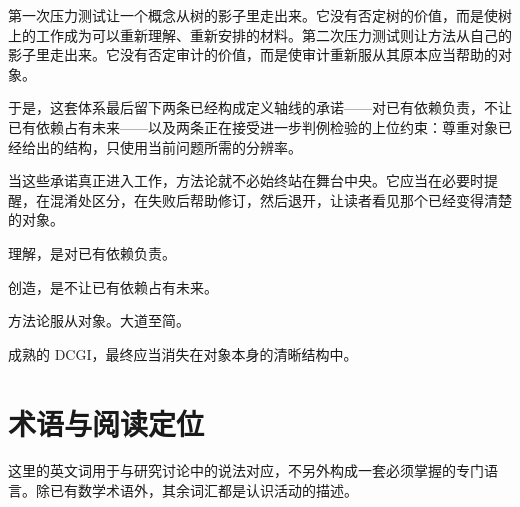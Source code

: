 \documentclass[UTF8,zihao=-4,fontset=none,oneside,openany]{ctexbook}
\begin{document}
第一次压力测试让一个概念从树的影子里走出来。它没有否定树的价值，而是使树上的工作成为可以重新理解、重新安排的材料。第二次压力测试则让方法从自己的影子里走出来。它没有否定审计的价值，而是使审计重新服从其原本应当帮助的对象。

于是，这套体系最后留下两条已经构成定义轴线的承诺——对已有依赖负责，不让已有依赖占有未来——以及两条正在接受进一步判例检验的上位约束：尊重对象已经给出的结构，只使用当前问题所需的分辨率。

当这些承诺真正进入工作，方法论就不必始终站在舞台中央。它应当在必要时提醒，在混淆处区分，在失败后帮助修订，然后退开，让读者看见那个已经变得清楚的对象。

\begin{casequote}
理解，是对已有依赖负责。\par
创造，是不让已有依赖占有未来。\par
方法论服从对象。大道至简。
\end{casequote}

\noindent 成熟的 DCGI，最终应当消失在对象本身的清晰结构中。

\appendix
{}
\chapter{术语与阅读定位}
\label{app:terms}
这里的英文词用于与研究讨论中的说法对应，不另外构成一套必须掌握的专门语言。除已有数学术语外，其余词汇都是认识活动的描述。
\end{document}

